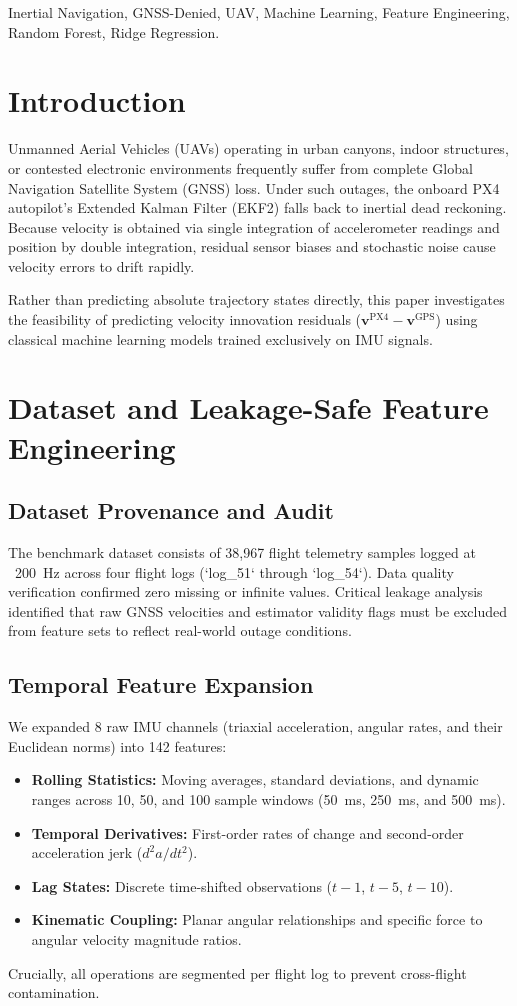 \documentclass[conference]{IEEEtran}
\begin{document}
\begin{IEEEkeywords}
Inertial Navigation, GNSS-Denied, UAV, Machine Learning, Feature Engineering, Random Forest, Ridge Regression.
\end{IEEEkeywords}

\section{Introduction}
Unmanned Aerial Vehicles (UAVs) operating in urban canyons, indoor structures, or contested electronic environments frequently suffer from complete Global Navigation Satellite System (GNSS) loss. Under such outages, the onboard PX4 autopilot's Extended Kalman Filter (EKF2) falls back to inertial dead reckoning. Because velocity is obtained via single integration of accelerometer readings and position by double integration, residual sensor biases and stochastic noise cause velocity errors to drift rapidly.

Rather than predicting absolute trajectory states directly, this paper investigates the feasibility of predicting velocity innovation residuals ($\mathbf{v}^{\text{PX4}} - \mathbf{v}^{\text{GPS}}$) using classical machine learning models trained exclusively on IMU signals.

\section{Dataset and Leakage-Safe Feature Engineering}
\subsection{Dataset Provenance and Audit}
The benchmark dataset consists of 38,967 flight telemetry samples logged at ~200~Hz across four flight logs (`log\_51` through `log\_54`). Data quality verification confirmed zero missing or infinite values. Critical leakage analysis identified that raw GNSS velocities and estimator validity flags must be excluded from feature sets to reflect real-world outage conditions.

\subsection{Temporal Feature Expansion}
We expanded 8 raw IMU channels (triaxial acceleration, angular rates, and their Euclidean norms) into 142 features:
\begin{itemize}
    \item \textbf{Rolling Statistics:} Moving averages, standard deviations, and dynamic ranges across 10, 50, and 100 sample windows (50~ms, 250~ms, and 500~ms).
    \item \textbf{Temporal Derivatives:} First-order rates of change and second-order acceleration jerk ($d^2a/dt^2$).
    \item \textbf{Lag States:} Discrete time-shifted observations ($t-1$, $t-5$, $t-10$).
    \item \textbf{Kinematic Coupling:} Planar angular relationships and specific force to angular velocity magnitude ratios.
\end{itemize}
Crucially, all operations are segmented per flight log to prevent cross-flight contamination.
\end{document}
